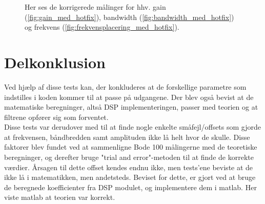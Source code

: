 \begin{figure}[h!]
	\centering
  	\caption{Her ses de korrigerede målinger for hhv. gain (\ref{fig:gain_med_hotfix}), bandwidth (\ref{fig:bandwidth_med_hotfix}) og frekvens (\ref{fig:frekvensplacering_med_hotfix}).}
	\label{fig:korr}
\end{figure}

\section{Delkonklusion}

Ved hjælp af disse tests kan, der konkluderes at de forskellige parametre som indstilles i koden kommer til at passe på udgangene. Der blev også bevist at de matematiske beregninger, altså DSP implementeringen, passer med teorien og at filtrene opfører sig som forventet. \\

Disse tests var derudover med til at finde nogle enkelte småfejl/offsets som gjorde at frekvensen, båndbredden samt amplituden ikke lå helt hvor de skulle. Disse faktorer blev fundet ved at sammenligne Bode 100 målingerne med de teoretiske beregninger, og derefter bruge "trial and error"-metoden til at finde de korrekte værdier. Årsagen til dette offset kendes endnu ikke, men tests'ene beviste at de ikke lå i matematikken, men andetsteds. 
Beviset for dette, er gjort ved at bruge de beregnede koefficienter fra DSP modulet, og implementere dem i matlab. 
Her viste matlab at teorien var korrekt. 













